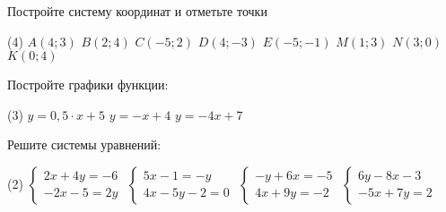 \begin{homework}[number=2]
	\begin{listofex}
		\item Постройте систему координат и отметьте точки
		\begin{tasks}(4)
			\task \( A(4;3) \)
			\task \( B(2;4) \)
			\task \( C(-5;2) \)
			\task \( D(4;-3) \)
			\task \( E(-5;-1) \)
			\task \( M(1;3) \)
			\task \( N(3;0) \)
			\task \( K(0;4) \)
		\end{tasks}
		\item Постройте графики функции:
		\begin{tasks}(3)
			\task \( y=0,5 \cdot x +5 \)
			\task \( y=-x+4 \)
			\task \( y=-4x+7 \)
		\end{tasks}
		
		\item Решите системы уравнений:
		\begin{tasks}(2)
			\task \( \begin{cases} 2x+4y=-6 \\ -2x-5=2y \end{cases} \)
			\task \( \begin{cases} 5x-1=-y \\ 4x-5y-2=0 \end{cases} \)
			\task \( \begin{cases} -y+6x=-5 \\ 4x+9y=-2 \end{cases} \)
			\task \( \begin{cases} 6y-8x-3 \\ -5x+7y=2 \end{cases} \)
		\end{tasks}
	\end{listofex}
\end{homework}

